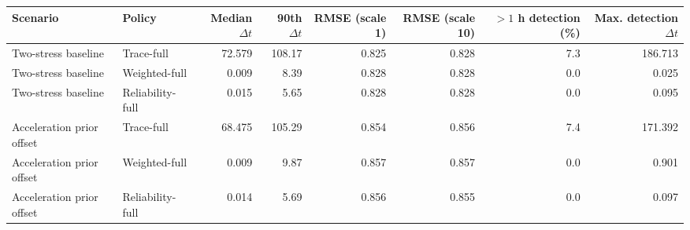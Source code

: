 \begin{tabular}{llrrrrrr}
\toprule
Scenario & Policy & Median $\Delta t$ & 90th $\Delta t$ & RMSE (scale 1) & RMSE (scale 10) & $>1$ h detection (\%) & Max. detection $\Delta t$ \\
\midrule
Two-stress baseline & Trace-full & 72.579 & 108.17 & 0.825 & 0.828 & 7.3 & 186.713 \\
Two-stress baseline & Weighted-full & 0.009 & 8.39 & 0.828 & 0.828 & 0.0 & 0.025 \\
Two-stress baseline & Reliability-full & 0.015 & 5.65 & 0.828 & 0.828 & 0.0 & 0.095 \\
Acceleration prior offset & Trace-full & 68.475 & 105.29 & 0.854 & 0.856 & 7.4 & 171.392 \\
Acceleration prior offset & Weighted-full & 0.009 & 9.87 & 0.857 & 0.857 & 0.0 & 0.901 \\
Acceleration prior offset & Reliability-full & 0.014 & 5.69 & 0.856 & 0.855 & 0.0 & 0.097 \\
\bottomrule
\end{tabular}
